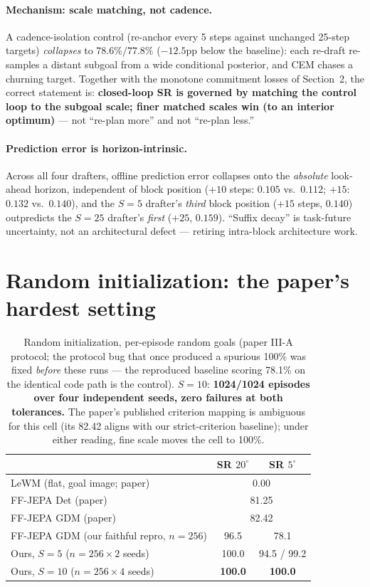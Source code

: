 \documentclass[11pt]{article}
\newcommand{\ours}[1]{\textbf{#1}}
\newcommand{\degc}[1]{$#1^\circ$}
\begin{document}
\paragraph{Mechanism: scale matching, not cadence.} A cadence-isolation control
(re-anchor every 5 steps against unchanged 25-step targets) \emph{collapses} to
$78.6\%/77.8\%$ ($-12.5$pp below the baseline): each re-draft re-samples a distant
subgoal from a wide conditional posterior, and CEM chases a churning target. Together
with the monotone commitment losses of Section~2, the correct statement is:
\textbf{closed-loop SR is governed by matching the control loop to the subgoal
scale; finer matched scales win (to an interior optimum)} --- not ``re-plan more''
and not ``re-plan less.''

\paragraph{Prediction error is horizon-intrinsic.} Across all four drafters, offline
prediction error collapses onto the \emph{absolute} look-ahead horizon, independent
of block position ($+10$ steps: $0.105$ vs.\ $0.112$; $+15$: $0.132$ vs.\ $0.140$),
and the $S{=}5$ drafter's \emph{third} block position ($+15$ steps, $0.140$)
outpredicts the $S{=}25$ drafter's \emph{first} ($+25$, $0.159$). ``Suffix decay''
is task-future uncertainty, not an architectural defect --- retiring intra-block
architecture work.

\section{Random initialization: the paper's hardest setting}

\begin{table}[h]
\centering
\begin{tabular}{lcc}
\toprule
& SR \degc{20} & SR \degc{5} \\
\midrule
LeWM (flat, goal image; paper) & \multicolumn{2}{c}{0.00} \\
FF-JEPA Det (paper) & \multicolumn{2}{c}{81.25} \\
FF-JEPA GDM (paper) & \multicolumn{2}{c}{82.42} \\
FF-JEPA GDM (our faithful repro, $n{=}256$) & 96.5 & 78.1 \\
Ours, $S{=}5$ ($n{=}256 \times 2$ seeds) & 100.0 & 94.5 / 99.2 \\
Ours, $S{=}10$ ($n{=}256 \times 4$ seeds) & \ours{100.0} & \ours{100.0} \\
\bottomrule
\end{tabular}
\caption{Random initialization, per-episode random goals (paper III-A protocol; the
protocol bug that once produced a spurious 100\% was fixed \emph{before} these runs
--- the reproduced baseline scoring 78.1\% on the identical code path is the
control). $S{=}10$: \ours{1024/1024 episodes over four independent seeds, zero failures at
both tolerances.} The paper's published criterion
mapping is ambiguous for this cell (its 82.42 aligns with our strict-criterion
baseline); under either reading, fine scale moves the cell to 100\%.}
\end{table}
\end{document}
